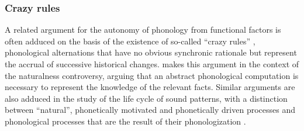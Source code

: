 \subsubsection{Crazy rules}
\label{sec:crazy-rules}

A related argument for the autonomy of phonology from functional factors is often adduced on the basis of the existence of so\hyp called \enquote{crazy rules} \citep{bach72:_how}, \ie phonological alternations that have no obvious synchronic rationale but represent the accrual of successive historical changes. \citet{anderson81:_why} makes this argument in the context of the naturalness controversy, arguing that an abstract phonological computation is necessary to represent the knowledge of the relevant facts. Similar arguments are also adduced in the study of the life cycle of sound patterns, with a distinction between \enquote{natural}, phonetically motivated and phonetically driven processes and phonological processes that are the result of their phonologization \citep[\egm][]{hyman76:_phonol,kiparsky95,mcmahon00:_lexic_phonol_englis,janda,barnesbook}.

